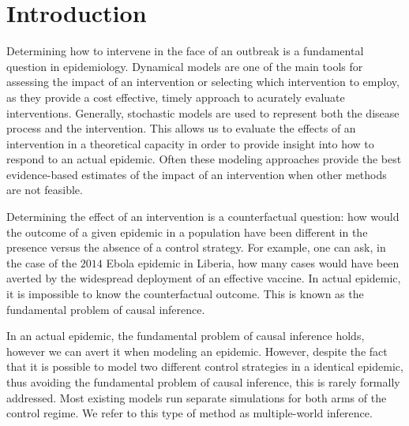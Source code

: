 \documentclass[openacc]{rsproca_new}%
\begin{document}

\maketitle


\section{Introduction}
Determining how to intervene in the face of an outbreak is a fundamental question in epidemiology.
Dynamical models are one of the main tools for assessing the impact of an intervention or selecting which intervention to employ, as they provide a cost effective, timely approach to acurately evaluate interventions.
Generally, stochastic models are used to represent both the disease process and the intervention.
This allows us to evaluate the effects of an intervention in a theoretical capacity in order to provide insight into how to respond to an actual epidemic.
Often these modeling approaches provide the best evidence-based estimates of the impact of an intervention when other methods are not feasible.

Determining the effect of an intervention is a counterfactual question: how would the outcome of a given epidemic in a population have been different in the presence versus the absence of a control strategy.
For example, one can ask, in the case of the $2014$ Ebola epidemic in Liberia, how many cases would have been averted by the widespread deployment of an effective vaccine.
In actual epidemic, it is impossible to know the counterfactual outcome.
This is known as the fundamental problem of causal inference.\cite{holland:1986}

In an actual epidemic, the fundamental problem of causal inference holds, however we can avert it when modeling an epidemic.
However, despite the fact that it is possible to model two different control strategies in a identical epidemic, thus avoiding the fundamental problem of causal inference, this is rarely formally addressed.
Most existing models run separate simulations for both arms of the control regime.
We refer to this type of method as multiple-world inference.
\end{document}
